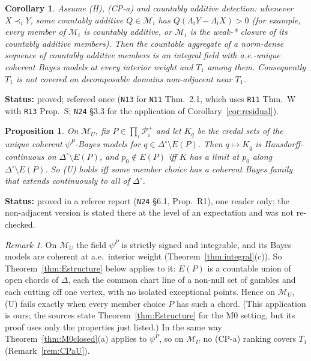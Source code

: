 \documentclass[11pt]{article}
\newtheorem{proposition}[theorem]{Proposition}
\newtheorem{corollary}[theorem]{Corollary}
\theoremstyle{definition}
\theoremstyle{remark}
\newtheorem{remark}[theorem]{Remark}
\newcommand{\Di}{\Delta^{\circ}}
\newcommand{\M}{\mathcal M}
\newcommand{\src}[1]{\texttt{#1}}
\newcommand{\status}[1]{\par\smallskip\noindent\textbf{Status:} #1\par\smallskip}
\begin{document}
\begin{corollary}\label{cor:DCA}
Assume (H), (CP-a) and countably additive detection: whenever $X\prec_iY$, some countably additive $Q\in\M_i$ has $Q(\Lambda_iY-\Lambda_iX)>0$ (for example, every member of $\M_i$ is countably additive, or $\M_i$ is the weak-* closure of its countably additive members). Then the countable aggregate of a norm-dense sequence of countably additive members is an integral field with a.e.-unique coherent Bayes models at every interior weight and $T_1$ among them. Consequently $T_1$ is not covered on decomposable domains non-adjacent near $T_1$.
\end{corollary}
\status{proved; refereed once (\src{N13} for \src{N11} Thm.~2.1, which uses \src{R11} Thm.~W with \src{R13} Prop.~S; \src{N24} \S3.3 for the application of Corollary~\ref{cor:residual}).}

\begin{proposition}\label{prop:Ucont}
On $\M_U$, fix $P\in\prod_i\mathcal P^+_i$ and let $K_q$ be the credal sets of the unique coherent $\psi^P$-Bayes models for $q\in\Di\setminus E(P)$. Then $q\mapsto K_q$ is Hausdorff-continuous on $\Di\setminus E(P)$, and $p_0\notin E(P)$ iff $K$ has a limit at $p_0$ along $\Di\setminus E(P)$. So (U) holds iff some member choice has a coherent Bayes family that extends continuously to all of $\Di$.
\end{proposition}
\status{proved in a referee report (\src{N24} \S6.1, Prop.~R1), one reader only; the non-adjacent version is stated there at the level of an expectation and was not re-checked.}

\begin{remark}\label{rem:EPchords}
On $\M_U$ the field $\psi^P$ is strictly signed and integrable, and its Bayes models are coherent at a.e.\ interior weight (Theorem~\ref{thm:integral}($c$)). So Theorem~\ref{thm:Estructure} below applies to it: $E(P)$ is a countable union of open chords of $\Delta$, each the common chart line of a non-null set of gambles and each cutting off one vertex, with no isolated exceptional points. Hence on $\M_U$, (U) fails exactly when every member choice $P$ has such a chord. (This application is ours; the sources state Theorem~\ref{thm:Estructure} for the M0 setting, but its proof uses only the properties just listed.) In the same way Theorem~\ref{thm:M0closed}(a) applies to $\psi^P$, so on $\M_U$ no (CP-a) ranking covers $T_1$ (Remark~\ref{rem:CPaU}).
\end{remark}
\end{document}
